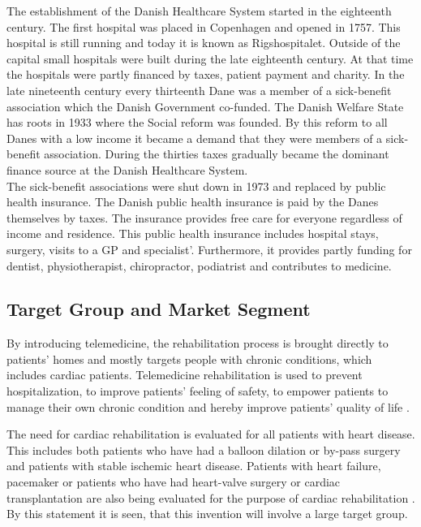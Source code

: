 The establishment of the Danish Healthcare System started in the eighteenth century. The first hospital was placed in Copenhagen and opened in 1757. This hospital is still running and today it is known as Rigshospitalet. Outside of the capital small hospitals were built during the late eighteenth century. At that time the hospitals were partly financed by taxes, patient payment and charity. In the late nineteenth century every thirteenth Dane was a member of a sick-benefit association which the Danish Government co-funded. The Danish Welfare State has roots in 1933 where the Social reform was founded. By this reform to all Danes with a low income it became a demand that they were members of a sick-benefit association. During the thirties taxes gradually became the dominant finance source at the Danish Healthcare System.\\ 
The sick-benefit associations were shut down in 1973 and replaced by public health insurance. The Danish public health insurance is paid by the Danes themselves by taxes. The insurance provides free care for everyone regardless of income and residence. This public health insurance includes hospital stays, surgery, visits to a GP and specialist'. Furthermore, it provides partly funding for dentist, physiotherapist, chiropractor, podiatrist and contributes to medicine.   \\

\subsection{Target Group and Market Segment}

By introducing telemedicine, the rehabilitation process is brought directly to patients' homes and mostly targets people with chronic conditions, which includes cardiac patients. Telemedicine rehabilitation is used to prevent hospitalization, to improve patients' feeling of safety, to empower patients to manage their own chronic condition and hereby improve patients' quality of life \cite{Emergence}. 

The need for cardiac rehabilitation is evaluated for all patients with heart disease. This includes both patients who have had a balloon dilation or by-pass surgery and patients with stable ischemic heart disease.
Patients with heart failure, pacemaker or patients who have had heart-valve surgery or cardiac transplantation are also being evaluated for the purpose of cardiac rehabilitation \cite{Rehabilitering}. By this statement it is seen, that this invention will involve a large target group.

